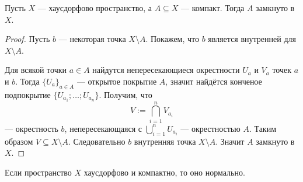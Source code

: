 \documentclass[12pt,a4paper]{article}
\DeclareMathOperator*{\bigtimes}{\text{\raisebox{-6pt}{\scalebox{3}{$\times$}}}}
\begin{document}

    \begin{theorem}\label{closed-compact-in-hausdorff-space}
        Пусть $X$ --- хаусдорфово пространство, а $A \subseteq X$ --- компакт. Тогда $A$ замкнуто в $X$.
    \end{theorem}

    \begin{proof}
        Пусть $b$ --- некоторая точка $X \setminus A$. Покажем, что $b$ является внутренней для $X \setminus A$.

        Для всякой точки $a \in A$ найдутся непересекающиеся окрестности $U_a$ и $V_a$ точек $a$ и $b$. Тогда $\{U_a\}_{a \in A}$ --- открытое покрытие $A$, значит найдётся конченое подпокрытие $\{U_{a_1}; \dots; U_{a_n}\}$. Получим, что
        \[V := \bigcap_{i=1}^n V_{a_i}\]
        --- окрестность $b$, непересекающаяся с $\bigcup_{i=1}^n U_{a_i}$ --- окрестностью $A$. Таким образом $V \subseteq X \setminus A$. Следовательно $b$ внутренняя точка $X \setminus A$. Значит $A$ замкнуто в $X$.
    \end{proof}

    \begin{theorem}
        Если пространство $X$ хаусдорфово и компактно, то оно нормально.
    \end{theorem}
\end{document}
